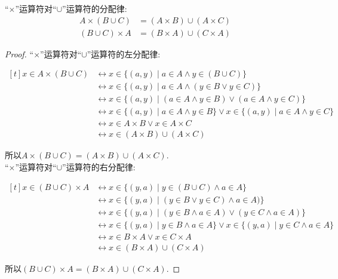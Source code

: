 \begin{proposition}
	``$\times$''运算符对``$\cup$''运算符的分配律:
	\begin{align}
		A\times (B\cup C) & =(A\times B)\cup (A\times C)\\
		(B\cup C)\times A & =(B\times A)\cup (C\times A)
	\end{align}
\end{proposition}

\begin{proof}
	``$\times$''运算符对``$\cup$''运算符的左分配律:

	$\begin{aligned}[t]
		x\in A\times (B\cup C) & \leftrightarrow x\in \{(a,y)\mid a\in A\wedge y\in (B\cup C)\}\\
		& \leftrightarrow x\in \{(a,y)\mid a\in A\wedge (y\in B\vee y\in C)\}\\
		& \leftrightarrow x\in \{(a,y)\mid (a\in A\wedge y\in B)\vee (a\in A\wedge y\in C)\}\\
		& \leftrightarrow x\in \{(a,y)\mid a\in A\wedge y\in B\}\vee x\in \{(a,y)\mid a\in A\wedge y\in C\}\\
		& \leftrightarrow x\in A\times B\vee x\in A\times C\\
		& \leftrightarrow x\in (A\times B)\cup (A\times C)
	\end{aligned}$

	所以$A\times (B\cup C)=(A\times B)\cup (A\times C)$.\\

	``$\times$''运算符对``$\cup$''运算符的右分配律:

	$\begin{aligned}[t]
		x\in (B\cup C)\times A & \leftrightarrow x\in \{(y,a)\mid y\in (B\cup C)\wedge a\in A\}\\
		& \leftrightarrow x\in \{(y,a)\mid (y\in B\vee y\in C)\wedge a\in A)\}\\
		& \leftrightarrow x\in \{(y,a)\mid (y\in B\wedge a\in A)\vee (y\in C\wedge a\in A)\}\\
		& \leftrightarrow x\in \{(y,a)\mid y\in B\wedge a\in A\}\vee x\in \{(y,a)\mid y\in C\wedge a\in A\}\\
		& \leftrightarrow x\in B\times A\vee x\in C\times A\\
		& \leftrightarrow x\in (B\times A)\cup (C\times A)
	\end{aligned}$

	所以$(B\cup C)\times A=(B\times A)\cup (C\times A)$.
\end{proof}

